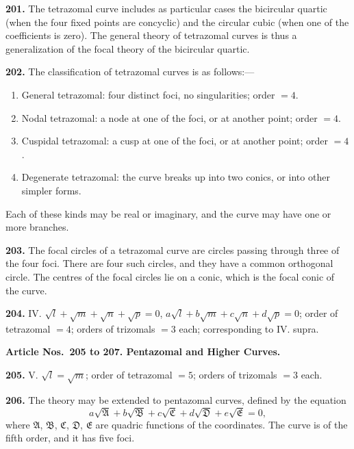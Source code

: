 \documentclass[12pt,a4paper]{article}
\theoremstyle{definition}
\begin{document}
\noindent\textbf{201.} The tetrazomal curve includes as particular cases the bicircular quartic
(when the four fixed points are concyclic) and the circular cubic (when one of the
coefficients is zero). The general theory of tetrazomal curves is thus a generalization
of the focal theory of the bicircular quartic.

\newpage
\noindent\textbf{202.} The classification of tetrazomal curves is as follows:---
\begin{enumerate}[label=\Roman*.]
\item General tetrazomal: four distinct foci, no singularities; order $= 4$.
\item Nodal tetrazomal: a node at one of the foci, or at another point; order $= 4$.
\item Cuspidal tetrazomal: a cusp at one of the foci, or at another point; order $= 4$.
\item Degenerate tetrazomal: the curve breaks up into two conics, or into other simpler forms.
\end{enumerate}
Each of these kinds may be real or imaginary, and the curve may have one or more
branches.

\noindent\textbf{203.} The focal circles of a tetrazomal curve are circles passing through three
of the four foci. There are four such circles, and they have a common orthogonal circle.
The centres of the focal circles lie on a conic, which is the focal conic of the curve.

\noindent\textbf{204.} IV. $\sqrt{l} + \sqrt{m} + \sqrt{n} + \sqrt{p} = 0$, $a\sqrt{l} + b\sqrt{m} + c\sqrt{n} + d\sqrt{p} = 0$; order of tetrazomal $= 4$;
orders of trizomals $= 3$ each; corresponding to IV. supra.

\vspace{0.5em}
\noindent\textbf{Article Nos.~205 to 207. Pentazomal and Higher Curves.}

\vspace{0.3em}
\noindent\textbf{205.} V. $\sqrt{l} = \sqrt{m}$; order of tetrazomal $= 5$; orders of trizomals $= 3$ each.

\noindent\textbf{206.} The theory may be extended to pentazomal curves, defined by the equation
\[
a\sqrt{\mathfrak{A}} + b\sqrt{\mathfrak{B}} + c\sqrt{\mathfrak{C}} + d\sqrt{\mathfrak{D}} + e\sqrt{\mathfrak{E}} = 0,
\]
where $\mathfrak{A}$, $\mathfrak{B}$, $\mathfrak{C}$, $\mathfrak{D}$, $\mathfrak{E}$ are quadric functions of the coordinates. The curve is of the
fifth order, and it has five foci.
\end{document}
